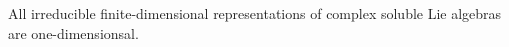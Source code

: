 All irreducible finite-dimensional representations of complex soluble Lie
algebras are one-dimensionsal.
